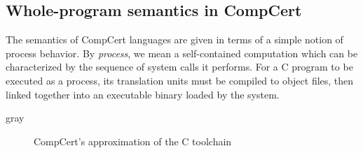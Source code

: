 \documentclass[sigplan,10pt,review]{acmart}
\newenvironment{optional}{\begin{color}{gray}}{\end{color}}
\begin{document}
\subsection{Whole-program semantics in CompCert} \label{sec:sem:closed} %

The semantics of CompCert languages
are given in terms of a simple notion of process behavior.
By \emph{process}, we mean a self-contained computation
which can be characterized by
the sequence of system calls it performs.
For a C program to be executed as a process,
its translation units must be compiled to object files,
then linked together
into an executable binary
loaded by the system.

\begin{optional}
\begin{figure} %
    \caption{CompCert's approximation of the C toolchain}
    \label{fig:process}
\end{figure}
\end{optional}
\end{document}
